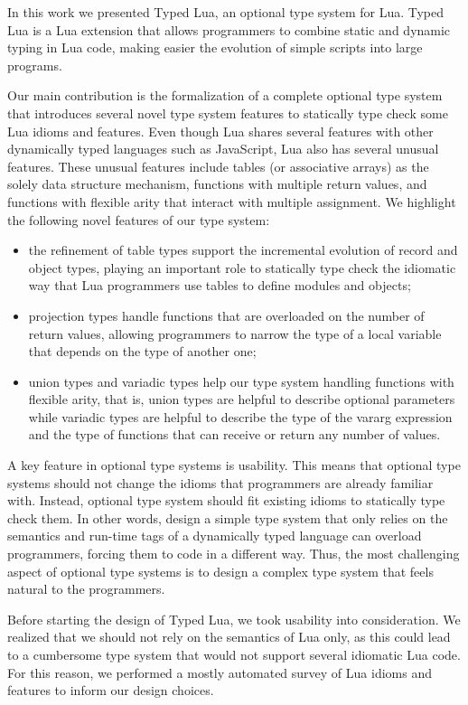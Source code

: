 In this work we presented Typed Lua, an optional type system for Lua.
Typed Lua is a Lua extension that allows programmers to combine
static and dynamic typing in Lua code, making easier the evolution
of simple scripts into large programs.

Our main contribution is the formalization of a complete optional type
system that introduces several novel type system features to statically
type check some Lua idioms and features.
Even though Lua shares several features with other dynamically
typed languages such as JavaScript, Lua also has several unusual features.
These unusual features include tables (or associative arrays) as the solely data
structure mechanism, functions with multiple return values, and functions
with flexible arity that interact with multiple assignment.
We highlight the following novel features of our type system:
\begin{itemize}
\item the refinement of table types support the incremental evolution
of record and object types, playing an important role to statically
type check the idiomatic way that Lua programmers use tables to
define modules and objects;
\item projection types handle functions that are overloaded on the
number of return values, allowing programmers to narrow the type of
a local variable that depends on the type of another one;
\item union types and variadic types help our type system handling
functions with flexible arity, that is, union types are helpful to
describe optional parameters while variadic types are helpful to
describe the type of the vararg expression and the type of functions
that can receive or return any number of values.
\end{itemize}

A key feature in optional type systems is usability.
This means that optional type systems should not change the idioms
that programmers are already familiar with.
Instead, optional type system should fit existing idioms to
statically type check them.
In other words, design a simple type system that only relies on
the semantics and run-time tags of a dynamically typed language
can overload programmers, forcing them to code in a different way.
Thus, the most challenging aspect of optional type systems is
to design a complex type system that feels natural to the programmers.

Before starting the design of Typed Lua, we took usability into consideration.
We realized that we should not rely on the semantics of Lua only,
as this could lead to a cumbersome type system that would not support
several idiomatic Lua code.
For this reason, we performed a mostly automated survey of Lua idioms
and features to inform our design choices.

